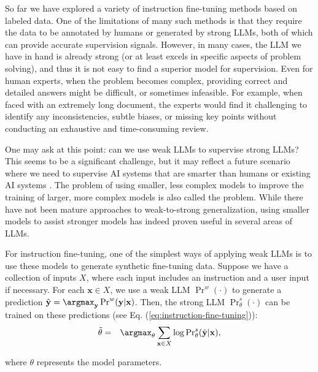 \noindent So far we have explored a variety of instruction fine-tuning methods based on labeled data. One of the limitations of many such methods is that they require the data to be annotated by humans or generated by strong LLMs, both of which can provide accurate supervision signals. However, in many cases, the LLM we have in hand is already strong (or at least excels in specific aspects of problem solving), and thus it is not easy to find a superior model for supervision. Even for human experts, when the problem becomes complex, providing correct and detailed answers might be difficult, or sometimes infeasible. For example, when faced with an extremely long document, the experts would find it challenging to identify any inconsistencies, subtle biases, or missing key points without conducting an exhaustive and time-consuming review.

One may ask at this point: can we use weak LLMs to supervise strong LLMs? This seems to be a significant challenge, but it may reflect a future scenario where we need to supervise AI systems that are smarter than humans or existing AI systems \cite{burns-etal:2023weakblog}. The problem of using smaller, less complex models to improve the training of larger, more complex models is also called the  problem. While there have not been mature approaches to weak-to-strong generalization, using smaller models to assist stronger models has indeed proven useful in several areas of LLMs.

For instruction fine-tuning, one of the simplest ways of applying weak LLMs is to use these models to generate synthetic fine-tuning data. Suppose we have a collection of inputs $X$, where each input includes an instruction and a user input if necessary. For each $\mathbf{x} \in X$, we use a weak LLM $\Pr^{w}(\cdot)$ to generate a prediction $\hat{\mathbf{y}} = \argmax_{\mathbf{y}} \Pr^{w}(\mathbf{y}|\mathbf{x})$. Then, the strong LLM $\Pr^{s}_{\theta}(\cdot)$ can be trained on these predictions (see Eq. (\ref{eq:instruction-fine-tuning})):
\begin{eqnarray}
\tilde{\theta} & = & \argmax_{\theta} \sum_{\mathbf{x} \in X} \log \mathrm{Pr}_{\theta}^{s}(\hat{\mathbf{y}}|\mathbf{x}),
\end{eqnarray}

\noindent where $\theta$ represents the model parameters.

